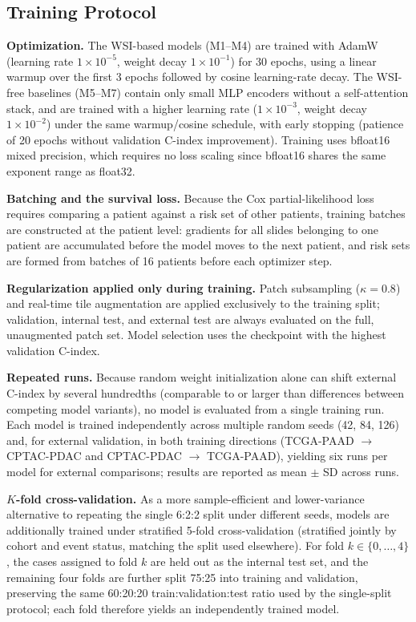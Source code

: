 %

\subsection{Training Protocol}
\label{subsec:training}

\textbf{Optimization.} The WSI-based models (M1--M4) are trained with AdamW
(learning rate $1\times10^{-5}$, weight decay $1\times10^{-1}$) for 30 epochs,
using a linear warmup over the first 3 epochs followed by cosine learning-rate
decay. The WSI-free baselines (M5--M7) contain only small MLP encoders without a
self-attention stack, and are trained with a higher learning rate
($1\times10^{-3}$, weight decay $1\times10^{-2}$) under the same warmup/cosine
schedule, with early stopping (patience of 20 epochs without validation C-index
improvement). Training uses bfloat16 mixed precision, which requires no loss
scaling since bfloat16 shares the same exponent range as float32.

\textbf{Batching and the survival loss.} Because the Cox partial-likelihood loss
requires comparing a patient against a risk set of other patients, training
batches are constructed at the patient level: gradients for all slides belonging
to one patient are accumulated before the model moves to the next patient, and
risk sets are formed from batches of 16 patients before each optimizer step.

\textbf{Regularization applied only during training.} Patch subsampling
($\kappa = 0.8$) and real-time tile augmentation are applied exclusively to the
training split; validation, internal test, and external test are always
evaluated on the full, unaugmented patch set. Model selection uses the
checkpoint with the highest validation C-index.

\textbf{Repeated runs.} Because random weight initialization alone can shift
external C-index by several hundredths (comparable to or larger than
differences between competing model variants), no model is evaluated from a
single training run. Each model is trained independently across multiple random
seeds (42, 84, 126) and, for external validation, in both training directions
(TCGA-PAAD $\rightarrow$ CPTAC-PDAC and CPTAC-PDAC $\rightarrow$ TCGA-PAAD),
yielding six runs per model for external comparisons; results are reported as
mean $\pm$ SD across runs.

\textbf{$K$-fold cross-validation.} As a more sample-efficient and lower-variance
alternative to repeating the single 6:2:2 split under different seeds, models
are additionally trained under stratified 5-fold cross-validation (stratified
jointly by cohort and event status, matching the split used elsewhere). For
fold $k \in \{0, \dots, 4\}$, the cases assigned to fold $k$ are held out as the
internal test set, and the remaining four folds are further split 75:25 into
training and validation, preserving the same 60:20:20 train:validation:test
ratio used by the single-split protocol; each fold therefore yields an
independently trained model.

